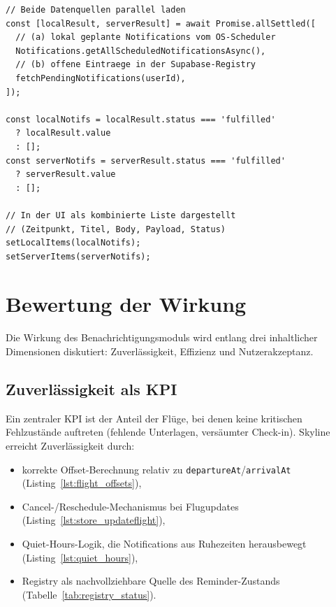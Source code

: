 \begin{lstlisting}[style=skyline-ts,
  caption={Pending-Notifications-Screen: paralleles Laden lokaler und
           serverseitiger Daten (app/pending-notifications.tsx)},
  label={lst:pending_screen}]
// Beide Datenquellen parallel laden
const [localResult, serverResult] = await Promise.allSettled([
  // (a) lokal geplante Notifications vom OS-Scheduler
  Notifications.getAllScheduledNotificationsAsync(),
  // (b) offene Eintraege in der Supabase-Registry
  fetchPendingNotifications(userId),
]);

const localNotifs = localResult.status === 'fulfilled'
  ? localResult.value
  : [];
const serverNotifs = serverResult.status === 'fulfilled'
  ? serverResult.value
  : [];

// In der UI als kombinierte Liste dargestellt
// (Zeitpunkt, Titel, Body, Payload, Status)
setLocalItems(localNotifs);
setServerItems(serverNotifs);
\end{lstlisting}

\section{Bewertung der Wirkung}
\label{sec:notifications-evaluation}

Die Wirkung des Benachrichtigungsmoduls wird entlang drei inhaltlicher Dimensionen
diskutiert: Zuverlässigkeit, Effizienz und Nutzerakzeptanz.

\subsection{Zuverlässigkeit als KPI}

Ein zentraler KPI ist der Anteil der Flüge, bei denen keine kritischen Fehlzustände
auftreten (fehlende Unterlagen, versäumter Check-in).
Skyline erreicht Zuverlässigkeit durch:

\begin{itemize}
  \item korrekte Offset-Berechnung relativ zu \texttt{departureAt}/\texttt{arrivalAt}
        (Listing~\ref{lst:flight_offsets}),
  \item Cancel-/Reschedule-Mechanismus bei Flugupdates
        (Listing~\ref{lst:store_updateflight}),
  \item Quiet-Hours-Logik, die Notifications aus Ruhezeiten herausbewegt
        (Listing~\ref{lst:quiet_hours}),
  \item Registry als nachvollziehbare Quelle des Reminder-Zustands
        (Tabelle~\ref{tab:registry_status}).
\end{itemize}

